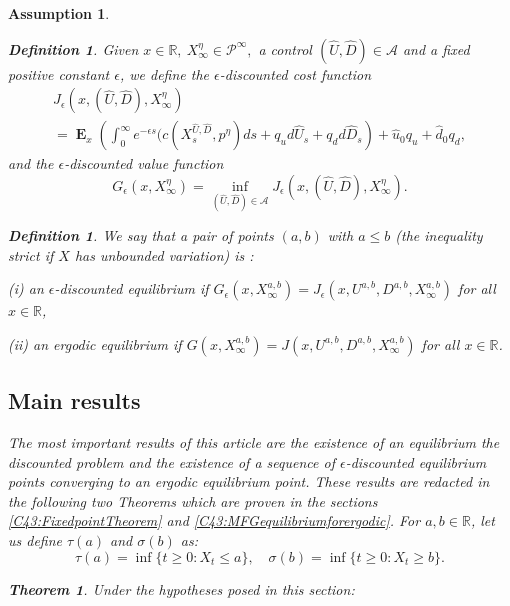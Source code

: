 \documentclass{article}
\newtheorem{theorem}[thm]{Theorem}
\newtheorem{assumptions}[thm]{Assumption}
\newtheorem{definition}[thm]{Definition}
\newcommand{\R}{\mathbb{R}}%
\newcommand\E{\operatorname{\mathbf{E}}}
\begin{document}
\begin{assumptions}
\begin{definition}\label{D:discountedgameMFG}
Given $x\in\R, \  X^{\eta}_{\infty}  \in \mathcal{P}^{\infty},$ a control $(\hat{U},\hat{D})\in\mathcal{A}$ and a fixed positive constant  $\epsilon$,
we define the $\epsilon$-discounted cost function 
\begin{multline*}
J_{\epsilon}(x,(\hat{U},\hat{D}), X^{\eta}_{\infty} )  \\ =   \E_x\left( \int_{0}^{\infty}e^{-\epsilon s}(c(X_s^{\hat{U},\hat{D}},p^{\eta})ds + q_ud\hat{U}_s + q_d  d\hat{D}_s\right) +\hat{u}_0 q_u+\hat{d}_0 q_d,  
\end{multline*}
%
%
and the $\epsilon$-discounted value function
\[
G_{\epsilon}(x, X^{\eta}_{\infty} )= \inf_{(\hat{U},\hat{D}) \in \mathcal{A}} J_{\epsilon}(x,(\hat{U},\hat{D}), X^{\eta}_{\infty} ).
\]

\end{definition}  



\begin{definition}\label{D:EquilibriumMFG}
We say that a  pair of points $(a,b)$ with $a \leq b$ (the inequality strict if $X$ has unbounded variation) is :
\vskip1mm\par\noindent
{\rm(i)} 
an $\epsilon$-discounted equilibrium if $G_{\epsilon}(x, X^{a,b}_{\infty} )=J_{\epsilon}(x,U^{a,b},D^{a,b}, X^{a,b}_{\infty} ) $ for all $x \in \mathbb{R}$,
\vskip1mm\par\noindent
{\rm(ii)}
an ergodic equilibrium if $G(x, X^{a,b}_{\infty} )=J(x,U^{a,b},D^{a,b}, X^{a,b}_{\infty} )$ for all $x \in \mathbb{R}$.
\end{definition}

\subsection{Main results}
 The most important results of this article are the existence of an equilibrium the discounted problem  and the existence of a sequence of $\epsilon$-discounted equilibrium points converging to an ergodic equilibrium point. These results are redacted in the following two Theorems which are proven in the sections
 \ref{C43:FixedpointTheorem} and \ref{C43:MFGequilibriumforergodic}. For $a, b \in \mathbb{R}$, let us define  $\tau(a)$ and $\sigma(b)$ as:
 $$
    \tau(a)=\inf\{t\geq 0\colon X_t\leq a\},
\quad
\sigma(b)=\inf\{t\geq 0\colon X_t\geq b\}. $$
%     



\begin{theorem}\label{T:MEANFIELDDISCOUNTEDPROBLEMSOLUTION}
Under the  hypotheses posed in this section:


\end{theorem}
\end{assumptions}
\end{document}
